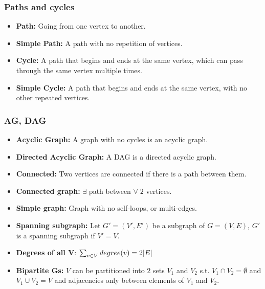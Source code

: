     \subsubsection{Paths and cycles}
    \begin{terminology}
        \begin{itemize}
            \item \textbf{Path:} Going from one vertex to another. 
            
            \item \textbf{Simple Path:} A path with no repetition of vertices.
            
            \item \textbf{Cycle:} A path that begins and ends at the same vertex, which can pass through the same vertex multiple times.

            \item \textbf{Simple Cycle:} A path that begins and ends at the same vertex, with no other repeated vertices.
        \end{itemize}
    \end{terminology}

    \subsubsection{AG, DAG}
    \begin{terminology}
        \begin{itemize}
            \item \textbf{Acyclic Graph:} A graph with no cycles is an acyclic graph.
            \item \textbf{Directed Acyclic Graph:} A DAG is a directed acyclic graph.

            \item \textbf{Connected:} Two vertices are connected if there is a path between them.
            \item \textbf{Connected graph:} $\exists$ path between $\forall \; 2$ vertices. 
            
            \item \textbf{Simple graph:} Graph with no self-loops, or multi-edges.
            \item \textbf{Spanning subgraph:} Let $G' = (V',E')$ be a subgraph of $G=(V,E)$, $G'$ is a spanning subgraph if $V'=V$.

            \item \textbf{Degrees of all V}: $\sum_{v\in V} degree(v) = 2\abs{E}$

            \item \textbf{Bipartite Gs:} $V$ can be partitioned into $2$ sets $V_1$ and $V_2$ s.t. $V_1 \cap V_2 = \emptyset$ and $V_1 \cup V_2 = V$ and adjacencies only between elements of $V_1$ and $V_2$.
        \end{itemize}
    \end{terminology}

